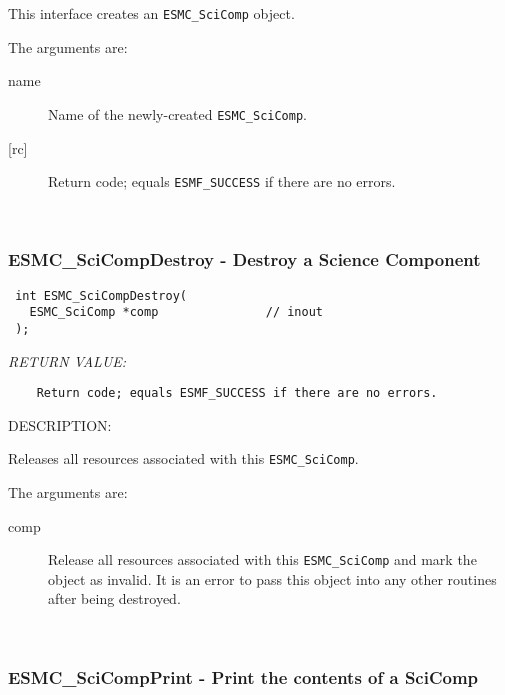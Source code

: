   
    This interface creates an {\tt ESMC\_SciComp} object. 
  
    The arguments are:
    \begin{description}
    \item[name]
      Name of the newly-created {\tt ESMC\_SciComp}.
    \item[{[rc]}]
     Return code; equals {\tt ESMF\_SUCCESS} if there are no errors.
    \end{description}
   
 
\mbox{}\hrulefill\ 
 
\subsubsection [ESMC\_SciCompDestroy] {ESMC\_SciCompDestroy - Destroy a Science Component}


  
\begin{verbatim} int ESMC_SciCompDestroy(
   ESMC_SciComp *comp               // inout
 );\end{verbatim}{\em RETURN VALUE:}
\begin{verbatim}    Return code; equals ESMF_SUCCESS if there are no errors.\end{verbatim}
{\sf DESCRIPTION:\\ }


  
    Releases all resources associated with this {\tt ESMC\_SciComp}.
  
    The arguments are:
    \begin{description}
    \item[comp]
      Release all resources associated with this {\tt ESMC\_SciComp} and mark
      the object as invalid. It is an error to pass this object into any other
      routines after being destroyed. 
   \end{description}
   
 
\mbox{}\hrulefill\ 
 
\subsubsection [ESMC\_SciCompPrint] {ESMC\_SciCompPrint - Print the contents of a SciComp}


